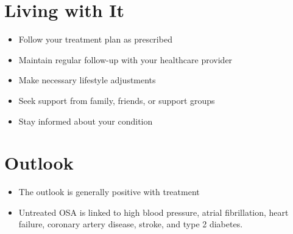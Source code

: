 \section{Living with It}
\begin{itemize}[noitemsep]
  \item Follow your treatment plan as prescribed
  \item Maintain regular follow-up with your healthcare provider
  \item Make necessary lifestyle adjustments
  \item Seek support from family, friends, or support groups
  \item Stay informed about your condition
\end{itemize}
\section{Outlook}
\begin{itemize}[noitemsep]
  \item The outlook is generally positive with treatment
  \item Untreated OSA is linked to high blood pressure, atrial fibrillation, heart failure, coronary artery disease, stroke, and type 2 diabetes.
\end{itemize}
